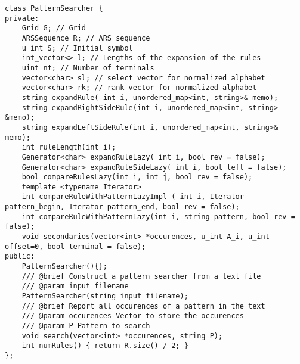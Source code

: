 \begin{lstlisting}[style=cppstyle, caption={Buscador de patrones}, label={lst:pattern}]
class PatternSearcher {
private:
    Grid G; // Grid
    ARSSequence R; // ARS sequence
    u_int S; // Initial symbol
    int_vector<> l; // Lengths of the expansion of the rules
    uint nt; // Number of terminals
    vector<char> sl; // select vector for normalized alphabet
    vector<char> rk; // rank vector for normalized alphabet
    string expandRule( int i, unordered_map<int, string>& memo);
    string expandRightSideRule(int i, unordered_map<int, string> &memo);
    string expandLeftSideRule(int i, unordered_map<int, string>& memo);
    int ruleLength(int i);    
    Generator<char> expandRuleLazy( int i, bool rev = false);
    Generator<char> expandRuleSideLazy( int i, bool left = false);
    bool compareRulesLazy(int i, int j, bool rev = false);
    template <typename Iterator> 
    int compareRuleWithPatternLazyImpl ( int i, Iterator pattern_begin, Iterator pattern_end, bool rev = false);
    int compareRuleWithPatternLazy(int i, string pattern, bool rev = false);
    void secondaries(vector<int> *occurences, u_int A_i, u_int offset=0, bool terminal = false);
public:
    PatternSearcher(){};    
    /// @brief Construct a pattern searcher from a text file
    /// @param input_filename 
    PatternSearcher(string input_filename);
    /// @brief Report all occurences of a pattern in the text
    /// @param occurences Vector to store the occurences
    /// @param P Pattern to search
    void search(vector<int> *occurences, string P);
    int numRules() { return R.size() / 2; }
};
\end{lstlisting}